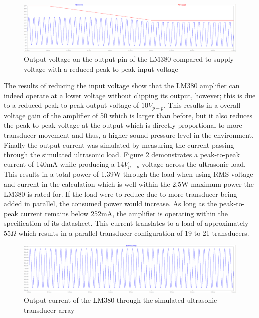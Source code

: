 \begin{figure}[ht!]
    \centering
    \includegraphics[width=\textwidth]{Figures/Design/amplifier/voutVsvsupplyInput100mv.png}
    \caption{Output voltage on the output pin of the LM380 compared to supply voltage with a reduced peak-to-peak input voltage}
    \label{fig:lm380outVsSupply100mvin}
\end{figure}

The results of reducing the input voltage show that the LM380 amplifier can indeed operate at a lower voltage without clipping its output, however; this is due to a reduced peak-to-peak output voltage of $10V_{p-p}$. This results in a overall voltage gain of the amplifier of 50 which is larger than before, but it also reduces the peak-to-peak voltage at the output which is directly proportional to more transducer movement and thus, a higher sound pressure level in the environment.\\
Finally the output current was simulated by measuring the current passing through the simulated ultrasonic load. Figure \ref{fig:lm380Iout} demonstrates a peak-to-peak current of 140mA while producing a $14V_{p-p}$ voltage across the ultrasonic load. This results in a total power of 1.39W through the load when using RMS voltage and current in the calculation which is well within the 2.5W maximum power the LM380 is rated for. If the load were to reduce due to more transducer being added in parallel, the consumed power would increase. As long as the peak-to-peak current remains below 252mA, the amplifier is operating within the specification of its datasheet. This current translates to a load of approximately 55$\Omega$ which results in a parallel transducer configuration of 19 to 21 transducers.

\begin{figure}[ht!]
    \centering
    \includegraphics[width=\textwidth]{Figures/Design/amplifier/ioutusonic.png}
    \caption{Output current of the LM380 through the simulated ultrasonic transducer array}
    \label{fig:lm380Iout}
\end{figure}

